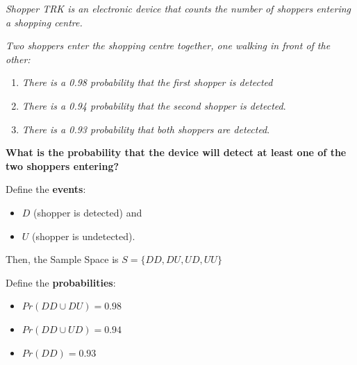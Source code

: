 \documentclass[notes=show, handout]{beamer}\usepackage[]{graphicx}\usepackage[]{color}
\begin{document}
\begin{frame}{\secname}
  \begin{example}
      \begin{footnotesize}
      \textit{Shopper TRK is an electronic device that counts the number of shoppers entering a shopping centre.}

      \textit{Two shoppers enter the shopping centre together, one walking in front of the other:}

      \begin{enumerate}
      \item \textit{There is a 0.98 probability that the first shopper is detected}
      \item \textit{There is a 0.94 probability that the second shopper is detected}.
      \item \textit{There is a 0.93 probability that both shoppers are detected}.
      \end{enumerate}
      \textbf{What is the probability that the device will detect at least one of the two shoppers entering?}
    \end{footnotesize}
  \end{example}
\end{frame}

\begin{frame}{\secname}
  \begin{example}
    \begin{footnotesize}
      Define the \textbf{events}:

      \begin{itemize}
      \item $D$ (shopper is detected) and
      \item $U$ (shopper is undetected).
      \end{itemize}

      Then, the Sample Space is $S=\{ DD, DU, UD, UU\}$

      Define the \textbf{probabilities}:
      \begin{itemize}
      \item $Pr(DD \cup DU) = 0.98$
      \item $Pr(DD \cup UD) = 0.94$
      \item $Pr(DD) = 0.93$
      \end{itemize}
    \end{footnotesize}
  \end{example}
\end{frame}
\end{document}
